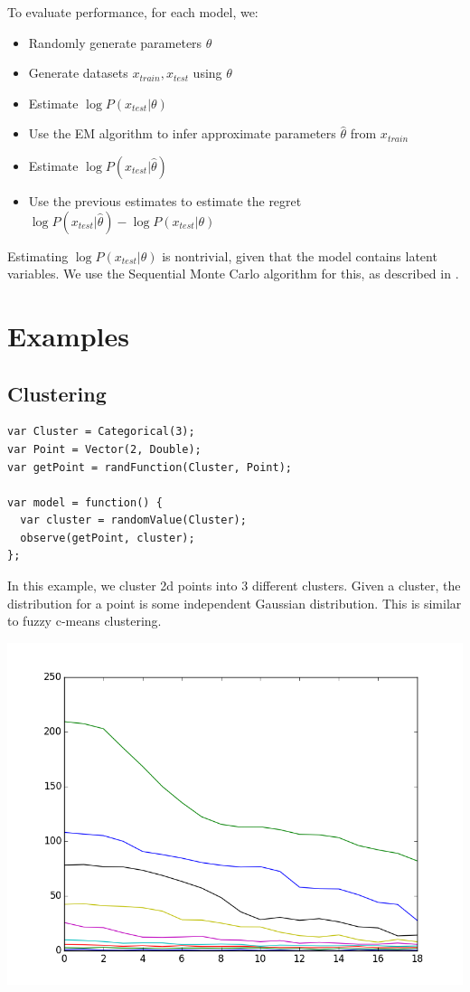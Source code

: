 \documentclass{article}
\begin{document}
    To evaluate performance, for each model, we:
    \begin{itemize}
      \item
        Randomly generate parameters $\theta$
      \item
        Generate datasets $x_{train}, x_{test}$ using $\theta$
      \item
        Estimate $\log P(x_{test} | \theta)$
      \item
        Use the EM algorithm to infer approximate parameters $\hat{\theta}$ from $x_{train}$
      \item
        Estimate $\log P(x_{test} | \hat{\theta})$
      \item
        Use the previous estimates to estimate the regret  $\log P(x_{test} | \hat{\theta}) - \log P(x_{test} | \theta)$
    \end{itemize}
    Estimating $\log P(x_{test} | \theta)$ is nontrivial, given that the model contains latent variables.
    We use the Sequential Monte Carlo algorithm for this, as described in \cite{dippl}.


  \section{Examples}

  \subsection{Clustering}
{\small
\begin{lstlisting}
var Cluster = Categorical(3);
var Point = Vector(2, Double);
var getPoint = randFunction(Cluster, Point);

var model = function() {
  var cluster = randomValue(Cluster);
  observe(getPoint, cluster);
};
\end{lstlisting}
}

In this example, we cluster 2d points into 3 different clusters.  Given a cluster, the distribution for a point is some independent Gaussian distribution.  This is similar to fuzzy c-means clustering.

\begin{center}
  \includegraphics[scale=0.5]{../plots/accuracy_nd_clustering.png}
\end{center}
\end{document}
